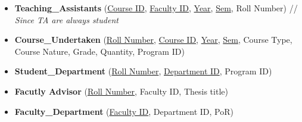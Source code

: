 \documentclass[a4paper]{article}
\begin{document}
\begin{itemize}
	\item \textbf{Teaching\_Assistants} (\underline{Course ID}, \underline{Faculty ID}, \underline{Year}, \underline{Sem}, Roll Number) // \textit{Since TA are always student}

	\item \textbf{Course\_Undertaken} (\underline{Roll Number}, \underline{Course ID}, \underline{Year}, \underline{Sem}, Course Type, Course Nature, Grade, Quantity, Program ID)

	\item \textbf{Student\_Department} (\underline{Roll Number}, \underline{Department ID}, Program ID)


	\item \textbf{Facutly Advisor} (\underline{Roll Number}, Faculty ID, Thesis title)

	\item \textbf{Faculty\_Department} (\underline{Faculty ID}, Department ID, PoR)

\end{itemize}
\end{document}

